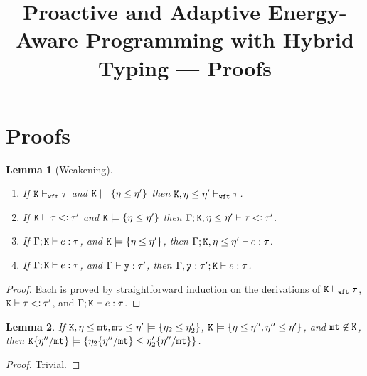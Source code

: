 \documentclass[onecolumn,nocopyrightspace]{sigplanconf}
\newtheorem{lemma}{Lemma}
\theoremstyle{lessintrusive}
\theoremstyle{plain}
\theoremstyle{custom}
\theoremstyle{subcase-custom}
\begin{document}
\title{Proactive and Adaptive Energy-Aware Programming with Hybrid Typing --- Proofs \vspace{-2em}}

\authorinfo{}{}{}

\maketitle

\section{Proofs} 


\begin{lemma}[Weakening]
\label{pf:weakening}
\leavevmode
\begin{enumerate}[(\arabic*)] 

\item If $\mathtt{K}\vdash_{\tt wft}\tau$ and $\mathtt{K} \models \{\eta\leq\eta'\}$ then $\mathtt{K},\eta\leq\eta'\vdash_{\tt wft}\tau$.

\item If $\mathtt{K}\vdash\tau\mathbin{<\vcentcolon}\tau'$ and $\mathtt{K} \models \{\eta\leq\eta'\}$ then $\Gamma;\mathtt{K},\eta\leq\eta'\vdash\tau\mathbin{<\vcentcolon}\tau'$.

\item If $\Gamma;\mathtt{K}\vdash e:\tau$, and $\mathtt{K} \models \{\eta\leq\eta'\}$, then $\Gamma;\mathtt{K},\eta\leq\eta' \vdash e:\tau$.

\item If $\Gamma;\mathtt{K}\vdash e:\tau$, and $\Gamma \vdash \mathtt{y}:\tau'$, then $\Gamma,\mathtt{y}:\tau';\mathtt{K} \vdash e:\tau$.

\end{enumerate}
\end{lemma}

\begin{proof}
Each is proved by straightforward induction on the derivations of $\mathtt{K}\vdash_{\tt wft}\tau$, $\mathtt{K}\vdash\tau\mathbin{<\vcentcolon}\tau'$, and $\Gamma;\mathtt{K}\vdash e:\tau$.
\end{proof} 

\begin{lemma}
\label{pf:modesubstitution-preserves-entailment}
If $\mathtt{K},\eta\leq\mathtt{mt},\mathtt{mt}\leq\eta'\models\{\eta_2\leq\eta_2'\}$, $\mathtt{K}\models\{\eta\leq\eta'',\eta''\leq\eta'\}$, and $\mathtt{mt} \not\in \mathtt{K}$, then $\mathtt{K}\{\eta''/\mathtt{mt}\}\models\{\eta_2\{\eta''/\mathtt{mt}\}\leq\eta_2'\{\eta''/\mathtt{mt}\}\}$.
\end{lemma}
%
\begin{proof}
Trivial.
\end{proof}
\end{document}
